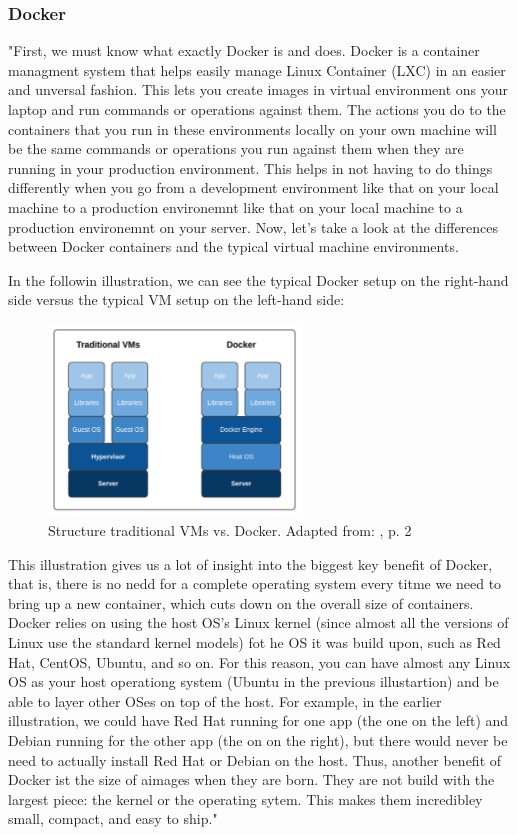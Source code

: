 \subsubsection{Docker}

"First, we must know what exactly Docker is and does. Docker is a container managment system that helps easily manage Linux Container (LXC) in an easier and unversal fashion. This lets you create images in virtual environment ons your laptop and run commands or operations against them. The actions you do to the containers that you run in these environments locally on your own machine will be the same commands or operations you run against them when they are running in your production environment. This helps in not having to do things differently when you go from a development environment like that on your local machine to  a production environemnt like that on your local machine to a production environemnt on your server. Now, let's take a look at the differences between Docker containers and the typical virtual machine environments.

In the followin illustration, we can see the typical Docker setup on the right-hand side versus the typical VM setup on the left-hand side:
\begin{figure}
    \centering
    \includegraphics[width=0.6\textwidth]{resources/images//docker_vs_vm.png}
    \caption[Structure traditional VMs vs. Docker]{Structure traditional VMs vs. Docker. Adapted from: \cite{Gal2015}, p. 2}
    \label{fig:vms_vs_docker}
\end{figure}

This illustration gives us a lot of insight into the biggest key benefit of Docker, that is, there is no nedd for a complete operating system every titme we need to bring up a new container, which cuts down on the overall size of containers. Docker relies on using the host OS's Linux kernel (since almost all the versions of Linux use the standard kernel models) fot he OS it was build upon, such as Red Hat, CentOS, Ubuntu, and so on. For this reason, you can have almost any Linux OS as your host operationg system (Ubuntu in the previous illustartion) and be able to layer other OSes on top of the host. For example, in the earlier illustration, we could have Red Hat running for one app (the one on the left) and Debian running for the other app (the on on the right), but there would never be need to actually install Red Hat or Debian on the host. Thus, another benefit of Docker ist the size of aimages when they are born. They are not build with the largest piece: the kernel or the operating sytem. This makes them incredibley small, compact, and easy to ship."\cite{Gal2015}


